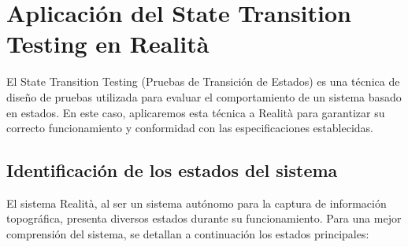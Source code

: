 \documentclass[12pt,a4paper, twoside]{article} %
\begin{document}
\section{Aplicación del State Transition Testing en Realità}
\label{sec:orgc1c4017}



El State Transition Testing (Pruebas de Transición de Estados) es una técnica de diseño de pruebas utilizada para evaluar el comportamiento de un sistema basado en estados. En este caso, aplicaremos esta técnica a Realità para garantizar su correcto funcionamiento y conformidad con las especificaciones establecidas.



\subsection{Identificación de los estados del sistema}
\label{sec:orgdaca22c}

El sistema Realità, al ser un sistema autónomo para la captura de información topográfica, presenta diversos estados durante su funcionamiento. Para una mejor comprensión del sistema, se detallan a continuación los estados principales:
\end{document}
